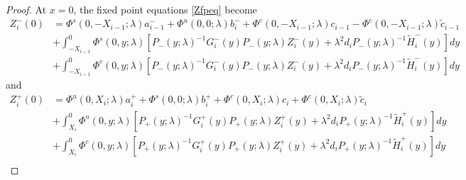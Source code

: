 \documentclass[thesis.tex]{subfiles}
\begin{document}
\begin{lemma}
\begin{proof}
At $x = 0$, the fixed point equations \eqref{Zfpeq} become
\begin{align*}
Z_i^-(0) &= \Phi^s(0, -X_{i-1}; \lambda) a_{i-1}^- + \Phi^u(0, 0; \lambda) b_i^- + \Phi^c(0, -X_{i-1}; \lambda) c_{i-1} -\Phi^c(0, -X_{i-1}; \lambda) \tilde{c}_{i-1} \\
&+ \int_{-X_{i-1}}^0 \Phi^s(0, y; \lambda)[P_-(y; \lambda)^{-1} G_i^-(y) P_-(y; \lambda)Z_i^-(y) + \lambda^2 d_i P_-(y; \lambda)^{-1} \tilde{H}_i^-(y)] dy \\
&+ \int_{-X_{i-1}}^0 \Phi^c(0, y; \lambda) [P_-(y; \lambda)^{-1} G_i^-(y) P_-(y; \lambda)Z_i^-(y) + \lambda^2 d_i P_-(y; \lambda)^{-1} \tilde{H}_i^-(y)] dy 
\end{align*}
and
\begin{align*}
Z_i^+(0) &= \Phi^u(0, X_i; \lambda) a_i^+ + \Phi^s(0, 0; \lambda) b_i^+ + \Phi^c(0, X_i; \lambda) c_i + \Phi^c(0, X_i; \lambda) \tilde{c}_i \\
&+ \int_{X_i}^0 \Phi^u(0, y; \lambda) [P_+(y; \lambda)^{-1} G_i^+(y) P_+(y; \lambda) Z_i^+(y) + \lambda^2 d_i P_+(y; \lambda)^{-1} \tilde{H}_i^+(y)] dy \\
&+ \int_{X_i}^0 \Phi^c(0, y; \lambda) [P_+(y; \lambda)^{-1} G_i^+(y) P_+(y; \lambda) Z_i^+(y) + \lambda^2 d_i P_+(y; \lambda)^{-1} \tilde{H}_i^+(y)] dy \\
\end{align*}


\end{proof}
\end{lemma}
\end{document}
